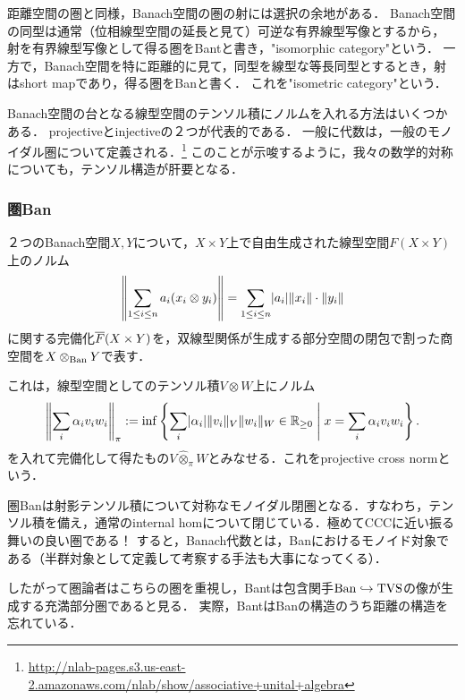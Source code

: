 \documentclass[uplatex,dvipdfmx]{jsreport}
\begin{document}
\begin{tcolorbox}[colframe=ForestGreen, colback=ForestGreen!10!white,breakable,colbacktitle=ForestGreen!40!white,coltitle=black,fonttitle=\bfseries\sffamily,
title=]
    距離空間の圏と同様，Banach空間の圏の射には選択の余地がある．
    Banach空間の同型は通常（位相線型空間の延長と見て）可逆な有界線型写像とするから，
    射を有界線型写像として得る圏をBantと書き，"isomorphic category"という．
    一方で，Banach空間を特に距離的に見て，同型を線型な等長同型とするとき，射はshort mapであり，得る圏をBanと書く．
    これを"isometric category"という．

    Banach空間の台となる線型空間のテンソル積にノルムを入れる方法はいくつかある．
    projectiveとinjectiveの２つが代表的である．
    一般に代数は，一般のモノイダル圏について定義される．\footnote{\url{http://nlab-pages.s3.us-east-2.amazonaws.com/nlab/show/associative+unital+algebra}}
    このことが示唆するように，我々の数学的対称についても，テンソル構造が肝要となる．
\end{tcolorbox}

\subsubsection{圏Ban}

\begin{definition}
    ２つのBanach空間$X,Y$について，$X\times Y$上で自由生成された線型空間$F(X\times Y)$上のノルム
    \[\left\|\sum_{1\le i\le n}a_i(x_i\otimes y_i)\right\|=\sum_{1\le i\le n}\lvert a_i\rvert\|x_i\|\cdot\|y_i\|\]
    に関する完備化$\overline{F}(X\times Y)$を，双線型関係が生成する部分空間の閉包で割った商空間を$X\otimes_{\mathrm{Ban}} Y$で表す．
\end{definition}
\begin{remarks}
    これは，線型空間としてのテンソル積$V\otimes W$上にノルム
    \[\left\|\sum_i\alpha_iv_iw_i\right\|_\pi:=\inf\left\{\sum_i\lvert\alpha_i\rvert\|v_i\|_V\|w_i\|_W\in\mathbb{R}_{\ge 0}\;\middle|\; x=\sum_i\alpha_iv_iw_i\right\}.\]
    を入れて完備化して得たもの$V\hat{\otimes}_\pi W$とみなせる．これをprojective cross normという．
\end{remarks}

\begin{lemma}
    圏Banは射影テンソル積について対称なモノイダル閉圏となる．すなわち，テンソル積を備え，通常のinternal homについて閉じている．極めてCCCに近い振る舞いの良い圏である！
    すると，Banach代数とは，Banにおけるモノイド対象である（半群対象として定義して考察する手法も大事になってくる）．
\end{lemma}
\begin{remark}
    したがって圏論者はこちらの圏を重視し，Bantは包含関手$\mathrm{Ban}\hookrightarrow\mathrm{TVS}$の像が生成する充満部分圏であると見る．
    実際，BantはBanの構造のうち距離の構造を忘れている．
\end{remark}
\end{document}
